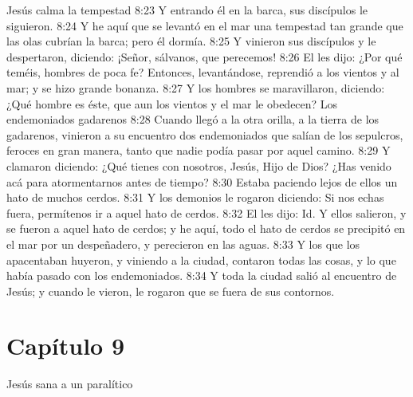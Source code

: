 Jesús calma la tempestad  
8:23 Y entrando él en la barca, sus discípulos le siguieron. 
8:24 Y he aquí que se levantó en el mar una tempestad tan grande que las olas cubrían la barca; pero él dormía. 
8:25 Y vinieron sus discípulos y le despertaron, diciendo: ¡Señor, sálvanos, que perecemos! 
8:26 El les dijo: ¿Por qué teméis, hombres de poca fe? Entonces, levantándose, reprendió a los vientos y al mar; y se hizo grande bonanza. 
8:27 Y los hombres se maravillaron, diciendo: ¿Qué hombre es éste, que aun los vientos y el mar le obedecen? 
Los endemoniados gadarenos  
8:28 Cuando llegó a la otra orilla, a la tierra de los gadarenos, vinieron a su encuentro dos endemoniados que salían de los sepulcros, feroces en gran manera, tanto que nadie podía pasar por aquel camino. 
8:29 Y clamaron diciendo: ¿Qué tienes con nosotros, Jesús, Hijo de Dios? ¿Has venido acá para atormentarnos antes de tiempo? 
8:30 Estaba paciendo lejos de ellos un hato de muchos cerdos. 
8:31 Y los demonios le rogaron diciendo: Si nos echas fuera, permítenos ir a aquel hato de cerdos. 
8:32 El les dijo: Id. Y ellos salieron, y se fueron a aquel hato de cerdos; y he aquí, todo el hato de cerdos se precipitó en el mar por un despeñadero, y perecieron en las aguas. 
8:33 Y los que los apacentaban huyeron, y viniendo a la ciudad, contaron todas las cosas, y lo que había pasado con los endemoniados. 
8:34 Y toda la ciudad salió al encuentro de Jesús; y cuando le vieron, le rogaron que se fuera de sus contornos. 
\section*{Capítulo 9}
Jesús sana a un paralítico  

